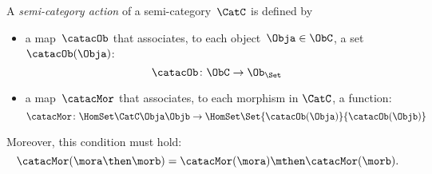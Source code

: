 \begin{ctdefinition}
    \label{def:semicategory-action}
    A \emph{semi-category action} of a semi-category~$\CatC$ is defined by
    \begin{itemize}
        \item a map~$\catacOb$ that associates, to each object~$\Obja \in \ObC$, a set~$\catacOb(\Obja)$:
        \begin{equation}
            \catacOb \colon \ObC \to \Ob_\Set
        \end{equation}
        \item a map~$\catacMor$ that associates, to each morphism in $\CatC$, a function:
        \begin{equation}
            \catacMor\colon \HomSet\CatC\Obja\Objb \to  \HomSet\Set{\catacOb(\Obja)}{\catacOb(\Objb) }
        \end{equation}
    \end{itemize}
    Moreover, this condition must hold:
    \begin{equation}
        \catacMor(\mora\then\morb) = \catacMor(\mora) \mthen \catacMor(\morb).
    \end{equation}
\end{ctdefinition}

